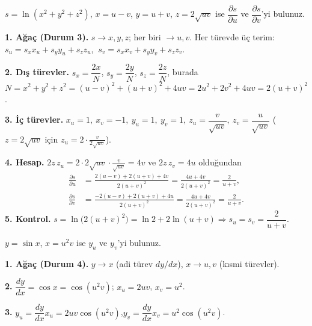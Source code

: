 \begin{soru}
$s=\ln(x^2+y^2+z^2)$, $x=u-v$, $y=u+v$, $z=2\sqrt{uv}$ ise $\dfrac{\partial s}{\partial u}$ ve $\dfrac{\partial s}{\partial v}$'yi bulunuz.
\end{soru}
\begin{cevap}
\textbf{1. Ağaç (Durum 3).} $s\to x,y,z$; her biri $\to u,v$. Her türevde üç terim:
$s_u=s_xx_u+s_yy_u+s_zz_u$, $\ s_v=s_xx_v+s_yy_v+s_zz_v$.

\textbf{2. Dış türevler.} $s_x=\dfrac{2x}{N}$, $s_y=\dfrac{2y}{N}$, $s_z=\dfrac{2z}{N}$, burada
$N=x^2+y^2+z^2=(u-v)^2+(u+v)^2+4uv=2u^2+2v^2+4uv=2(u+v)^2$.

\textbf{3. İç türevler.} $x_u=1,\ x_v=-1,\ y_u=1,\ y_v=1,\ z_u=\dfrac{v}{\sqrt{uv}},\ z_v=\dfrac{u}{\sqrt{uv}}$
($z=2\sqrt{uv}$ için $z_u=2\cdot\frac{v}{2\sqrt{uv}}$).

\textbf{4. Hesap.} $2z\,z_u=2\cdot2\sqrt{uv}\cdot\frac{v}{\sqrt{uv}}=4v$ ve $2z\,z_v=4u$ olduğundan
\begin{align*}
\frac{\partial s}{\partial u}&=\frac{2(u-v)+2(u+v)+4v}{2(u+v)^2}=\frac{4u+4v}{2(u+v)^2}=\boxed{\frac{2}{u+v}},\\
\frac{\partial s}{\partial v}&=\frac{-2(u-v)+2(u+v)+4u}{2(u+v)^2}=\frac{4u+4v}{2(u+v)^2}=\boxed{\frac{2}{u+v}}.
\end{align*}
\textbf{5. Kontrol.} $s=\ln\big(2(u+v)^2\big)=\ln2+2\ln(u+v)\Rightarrow s_u=s_v=\dfrac{2}{u+v}$. \checkmark
\end{cevap}

\begin{soru}
$y=\sin x$, $x=u^2v$ ise $y_u$ ve $y_v$'yi bulunuz.
\end{soru}
\begin{cevap}
\textbf{1. Ağaç (Durum 4).} $y\to x$ (adi türev $dy/dx$), $x\to u,v$ (kısmi türevler).

\textbf{2.} $\dfrac{dy}{dx}=\cos x=\cos(u^2v)$; $x_u=2uv$, $x_v=u^2$.

\textbf{3.} $y_u=\dfrac{dy}{dx}x_u=\boxed{2uv\cos(u^2v)}$,\qquad $y_v=\dfrac{dy}{dx}x_v=\boxed{u^2\cos(u^2v)}$.
\end{cevap}

